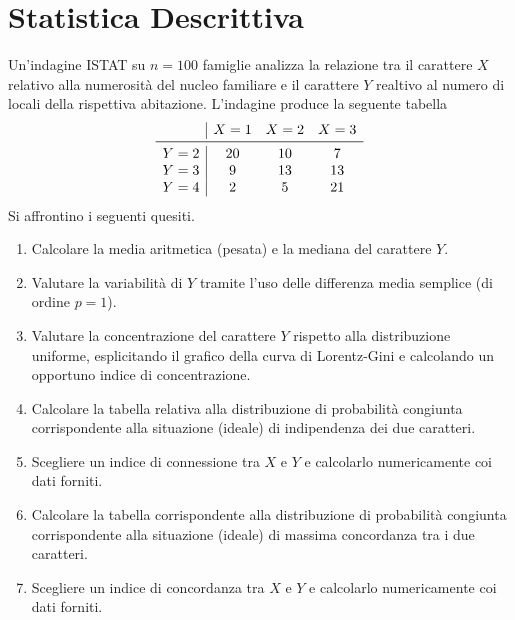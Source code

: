 
\section{Statistica Descrittiva}

\begin{esercizio}
Un'indagine ISTAT su $n = 100$ famiglie analizza la relazione tra il carattere $X$ relativo alla numerosità del nucleo familiare e il carattere $Y$ realtivo al numero di locali della rispettiva abitazione. L'indagine produce la seguente tabella
\[
\begin{array}{c|ccc}
      & X = 1 & X = 2 & X = 3 \\
\midrule
Y = 2 & 20    & 10    & 7     \\
Y = 3 & 9     & 13    & 13    \\
Y = 4 & 2     & 5     & 21
\end{array}
\]
Si affrontino i seguenti quesiti.
\begin{enumerate}[leftmargin=*]
\item Calcolare la media aritmetica (pesata) e la mediana del carattere $Y$.
\item Valutare la variabilità di $Y$ tramite l'uso delle differenza media semplice (di ordine $p = 1$).
\item Valutare la concentrazione del carattere $Y$ rispetto alla distribuzione uniforme, esplicitando il grafico della curva di Lorentz-Gini e calcolando un opportuno indice di concentrazione.
\item Calcolare la tabella relativa alla distribuzione di probabilità congiunta corrispondente alla situazione (ideale) di indipendenza dei due caratteri.
\item Scegliere un indice di connessione tra $X$ e $Y$ e calcolarlo numericamente coi dati forniti.
\item Calcolare la tabella corrispondente alla distribuzione di probabilità congiunta corrispondente alla situazione (ideale) di massima concordanza tra i due caratteri.
\item Scegliere un indice di concordanza tra $X$ e $Y$ e calcolarlo numericamente coi dati forniti.
\end{enumerate}
\end{esercizio}

